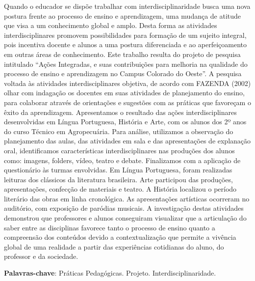 \documentclass[article,12pt,onesidea,4paper,english,brazil]{abntex2}
\begin{document}
	\noindent Quando o educador se dispõe trabalhar com interdisciplinaridade busca uma nova
	postura frente ao processo de ensino e aprendizagem, uma mudança de atitude que
	visa a um conhecimento global e amplo. Desta forma as atividades interdisciplinares
	promovem possibilidades para formação de um sujeito integral, pois incentiva
	docente e alunos a uma postura diferenciada e ao aperfeiçoamento em outras áreas
	de conhecimento. Este trabalho resulta do projeto de pesquisa intitulado “Ações
	Integradas, e suas contribuições para melhoria na qualidade do processo de ensino
	e aprendizagem no Campus Colorado do Oeste”. A pesquisa voltada às atividades
	interdisciplinares objetiva, de acordo com FAZENDA (2002) olhar com indagação os
	docentes em suas atividades de planejamento do ensino, para colaborar através de
	orientações e sugestões com as práticas que favoreçam o êxito da aprendizagem.
	Apresentamos o resultado das ações interdisciplinares desenvolvidas em Língua
	Portuguesa, História e Arte, com os alunos dos 2º anos do curso Técnico em
	Agropecuária. Para análise, utilizamos a observação do planejamento das aulas, das
	atividades em sala e das apresentações de explanação oral, identificamos
	características interdisciplinares nas produções dos alunos como: imagens, folders,
	vídeo, teatro e debate. Finalizamos com a aplicação de questionário às turmas
	envolvidas. Em Língua Portuguesa, foram realizadas leituras dos clássicos da
	literatura brasileira. Arte participou das produções, apresentações, confecção de
	materiais e teatro. A História localizou o período literário das obras em linha
	cronológica. As apresentações artísticas ocorreram no auditório, com exposição de
	paródias musicais. A investigação destas atividades demonstrou que professores e
	alunos conseguiram visualizar que a articulação do saber entre as disciplinas
	favorece tanto o processo de ensino quanto a compreensão dos conteúdos devido a
	contextualização que permite a vivência global de uma realidade a partir das
	experiências cotidianas do aluno, do professor e da sociedade.
	
	\vspace{\onelineskip}
	
	\noindent
	\textbf{Palavras-chave}: Práticas Pedagógicas. Projeto. Interdisciplinaridade.
	
\end{document}
